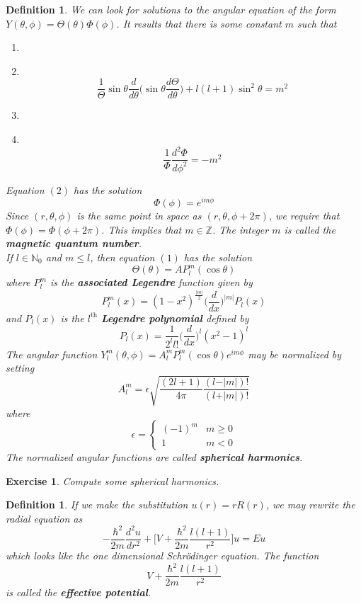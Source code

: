 \documentclass[12pt]{amsart}
\newtheorem{defn}[thm]{Definition}
\newtheorem{ex}[thm]{Exercise}
\newcommand{\sch}{Schr\"{o}dinger }
\newcommand\Item[1][]{%
  \ifx\relax#1\relax  \item \else \item[#1] \fi
  \abovedisplayskip=0pt\abovedisplayshortskip=0pt~\vspace*{-\baselineskip}}
\newcommand{\ep}{\epsilon}
\newcommand{\N}{\mathbb{N}}
\newcommand{\Z}{\mathbb{Z}}
\begin{document}
\begin{defn}
We can look for solutions to the angular equation of the form \\$Y(\theta, \phi) = \Theta(\theta)\Phi(\phi)$. It results that there is some constant $m$ such that 
\begin{enumerate}
\Item 
$$\frac{1}{\Theta}  \sin \theta \frac{d}{d\theta}\bigg( \sin \theta \frac{d\Theta}{d\theta} \bigg) + l (l+1) \sin^2 \theta = m^2$$
\vspace{3mm}
\Item $$\frac{1}{\Phi} \frac{d^2 \Phi}{d\phi^2} = -m^2$$
\end{enumerate} \vspace{3mm}
Equation $(2)$ has the solution $$\Phi(\phi) = e^{im\phi}$$
Since $(r,\theta, \phi)$ is the same point in space as $(r, \theta, \phi+2 \pi)$, we require that $\Phi(\phi) = \Phi(\phi+2\pi)$. This implies that $m \in \Z$. The integer $m$ is called the \textbf{magnetic quantum number}. \vspace{3mm}\\ 
If $l \in \N_0$ and $m \leq l$, then equation $(1)$ has the solution $$\Theta(\theta) = AP_l^m(\cos \theta)$$ where $P_l^m$ is the \textbf{associated Legendre} function given by $$P_l^m(x) = (1-x^2)^{\frac{\vert m \vert}{2}}\bigg(\frac{d}{dx} \bigg)^{\vert m \vert} P_l(x)$$ and $P_l(x)$ is the $l^{\text{th}}$ \textbf{Legendre polynomial} defined by $$P_l(x) = \frac{1}{2^l l!} \bigg(\frac{d}{dx} \bigg)^{l}(x^2 -1)^l$$ \vspace{3mm} The angular function $Y^m_l(\theta, \phi) = A_l^m P_l^m(\cos \theta)e^{im\phi}$ may be normalized by setting $$A_l^m = \ep \sqrt{\frac{(2l+1)}{4\pi} \frac{(l-\vert m \vert)!}{(l+ \vert m \vert)!}}$$ where $$\ep = 
\begin{cases}
(-1)^m & m \geq 0\\
1 & m < 0
\end{cases}$$ The normalized angular functions are called \textbf{spherical harmonics}.
\end{defn}

\begin{ex}
Compute some spherical harmonics.
\end{ex}

\begin{defn}
If we make the substitution $u(r) = rR(r)$, we may rewrite the radial equation as $$-\frac{\hbar^2}{2m}\frac{d^2u}{dr^2} + \bigg[V+ \frac{\hbar^2}{2m}\frac{l(l+1)}{r^2} \bigg]u = Eu$$ which looks like the one dimensional \sch equation. The function $$V+ \frac{\hbar^2}{2m}\frac{l(l+1)}{r^2}$$ is called the \textbf{effective potential}.
\end{defn}
\end{document}
